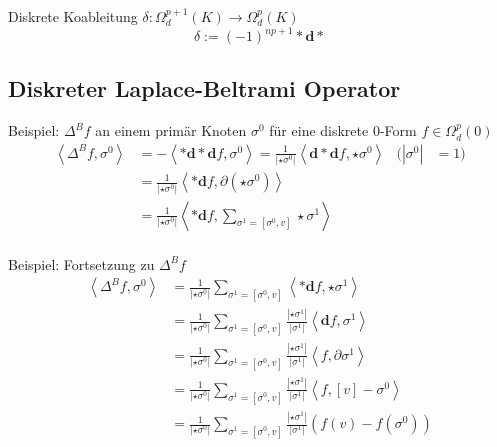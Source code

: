 \documentclass{beamer}
\renewcommand{\d}{\textbf{d}}
\begin{document}
  \begin{frame}
    \begin{block}{Diskrete Koableitung \( \delta: \Omega_{d}^{p+1}(K) \longrightarrow \Omega_{d}^{p}(K) \)}
      \[ \delta := (-1)^{np+1} * \d * \]
    \end{block}
    
    \subsection{Diskreter Laplace-Beltrami Operator}
    \begin{block}{Beispiel: \( \Delta^{B}f \) an einem primär Knoten \( \sigma^{0} \) für eine diskrete \( 0
    \)-Form \( f \in \Omega_{d}^{p}(0)\)}
      \begin{align*}
        \left\langle \Delta^{B}f , \sigma^{0} \right\rangle 
                &= - \left\langle * \d * \d f , \sigma^{0}  \right\rangle
                 = \frac{1}{|\star\sigma^{0}|} \left\langle \d * \d f , \star\sigma^{0} \right\rangle
                                  & (|\sigma^{0}| &= 1) \\
                &= \frac{1}{|\star\sigma^{0}|} \left\langle * \d f , \partial(\star\sigma^{0}) \right\rangle \\
                &= \frac{1}{|\star\sigma^{0}|} \left\langle * \d f , \sum_{\sigma^{1}=[\sigma^{0},v]} \star\sigma^{1}\right\rangle \\
      \end{align*}
    \end{block}
  \end{frame}

  \begin{frame}
    \begin{block}{Beispiel: Fortsetzung zu \( \Delta^{B}f \)}
      \begin{align*}
        \left\langle \Delta^{B}f , \sigma^{0} \right\rangle
                &= \frac{1}{|\star\sigma^{0}|} \sum_{\sigma^{1}=[\sigma^{0},v]} \left\langle * \d f ,\star\sigma^{1}\right\rangle \\
                &= \frac{1}{|\star\sigma^{0}|} \sum_{\sigma^{1}=[\sigma^{0},v]} \frac{|\star\sigma^{1}|}{|\sigma^{1}|} \left\langle \d f , \sigma^{1}\right\rangle \\
                &= \frac{1}{|\star\sigma^{0}|} \sum_{\sigma^{1}=[\sigma^{0},v]} \frac{|\star\sigma^{1}|}{|\sigma^{1}|} \left\langle f , \partial\sigma^{1}\right\rangle \\
                &= \frac{1}{|\star\sigma^{0}|} \sum_{\sigma^{1}=[\sigma^{0},v]} \frac{|\star\sigma^{1}|}{|\sigma^{1}|} \left\langle f , [v] - \sigma^{0} \right\rangle \\
                &= \frac{1}{|\star\sigma^{0}|} \sum_{\sigma^{1}=[\sigma^{0},v]} \frac{|\star\sigma^{1}|}{|\sigma^{1}|} \left( f(v) - f(\sigma^{0}) \right)
      \end{align*}
    \end{block}
  \end{frame}
\end{document}
